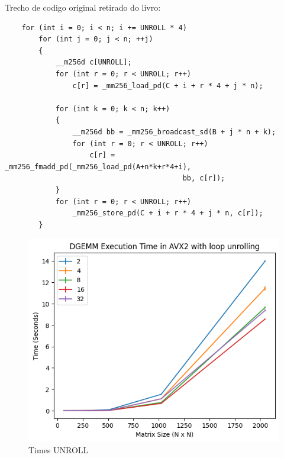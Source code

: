 \documentclass[12pt]{article}
\begin{document}
Trecho de codigo original retirado do livro:

\begin{lstlisting}
    for (int i = 0; i < n; i += UNROLL * 4)
        for (int j = 0; j < n; ++j)
        {
            __m256d c[UNROLL];
            for (int r = 0; r < UNROLL; r++)
                c[r] = _mm256_load_pd(C + i + r * 4 + j * n);
    
            for (int k = 0; k < n; k++)
            {
                __m256d bb = _mm256_broadcast_sd(B + j * n + k);
                for (int r = 0; r < UNROLL; r++)
                    c[r] = _mm256_fmadd_pd(_mm256_load_pd(A+n*k+r*4+i), 
                                          bb, c[r]);
            }
            for (int r = 0; r < UNROLL; r++)
                _mm256_store_pd(C + i + r * 4 + j * n, c[r]);
        }
\end{lstlisting}

\begin{figure}[h]
    \centering
    \includegraphics[scale=0.75]{figures/times_unroll.png}
    \caption{Times UNROLL}
    \label{fig:times-unroll}
\end{figure}
\end{document}
